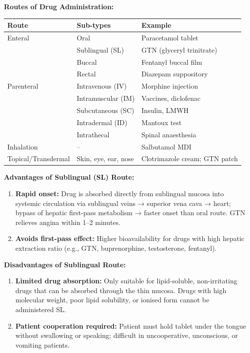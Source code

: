 \documentclass[11pt,a4paper]{article}
\begin{document}
\begin{ansbox}
\textbf{Routes of Drug Administration:}
\begin{center}
\begin{tabular}{lll}
\toprule
\textbf{Route} & \textbf{Sub-types} & \textbf{Example} \\
\midrule
Enteral & Oral & Paracetamol tablet \\
 & Sublingual (SL) & GTN (glyceryl trinitrate) \\
 & Buccal & Fentanyl buccal film \\
 & Rectal & Diazepam suppository \\
Parenteral & Intravenous (IV) & Morphine injection \\
 & Intramuscular (IM) & Vaccines, diclofenac \\
 & Subcutaneous (SC) & Insulin, LMWH \\
 & Intradermal (ID) & Mantoux test \\
 & Intrathecal & Spinal anaesthesia \\
Inhalation & -- & Salbutamol MDI \\
Topical/Transdermal & Skin, eye, ear, nose & Clotrimazole cream; GTN patch \\
\bottomrule
\end{tabular}
\end{center}

\textbf{Advantages of Sublingual (SL) Route:}
\begin{enumerate}[leftmargin=*]
    \item \textbf{Rapid onset:} Drug is absorbed directly from sublingual mucosa into systemic circulation via sublingual veins → superior vena cava → heart; bypass of hepatic first-pass metabolism → faster onset than oral route. GTN relieves angina within 1--2 minutes.
    \item \textbf{Avoids first-pass effect:} Higher bioavailability for drugs with high hepatic extraction ratio (e.g., GTN, buprenorphine, testosterone, fentanyl).
\end{enumerate}

\textbf{Disadvantages of Sublingual Route:}
\begin{enumerate}[leftmargin=*]
    \item \textbf{Limited drug absorption:} Only suitable for lipid-soluble, non-irritating drugs that can be absorbed through the thin mucosa. Drugs with high molecular weight, poor lipid solubility, or ionised form cannot be administered SL.
    \item \textbf{Patient cooperation required:} Patient must hold tablet under the tongue without swallowing or speaking; difficult in uncooperative, unconscious, or vomiting patients.
\end{enumerate}
\end{ansbox}
\end{document}
